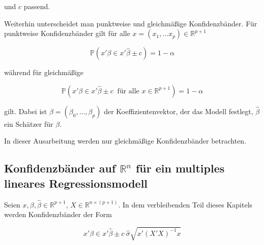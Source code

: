 \documentclass[12pt,a4paper]{article}
\theoremstyle{definition}
\newtheorem{Beispiel}[Definition]{Beispiel}
\theoremstyle{definition}
\theoremstyle{definition}
\theoremstyle{definition}
\begin{document}
und $c$ passend.

Weiterhin unterscheidet man punktweise und gleichmäßige Konfidenzbänder. Für punktweise Konfidenzbänder gilt für alle $x=(x_{1}, \ldots x_{p}) \in \mathbb{R}^{p+1}$

\begin{equation*}
\mathbb{P}(x'\beta \in x' \hat{\beta} \pm c) = 1-\alpha
\end{equation*}

während für gleichmäßige 

\begin{equation*}
\mathbb{P}(x'\beta \in x' \hat{\beta} \pm c ~ \text{ für alle } x \in \mathbb{R}^{p+1}) = 1-\alpha
\end{equation*}

gilt. Dabei ist $\beta=(\beta_{0}, \ldots, \beta_{p})$ der Koeffizientenvektor, der das Modell festlegt, $\hat{\beta}$ ein Schätzer für $\beta$. 

In dieser Ausarbeitung werden nur gleichmäßige Konfidenzbänder betrachten.



%
%
%
%

 

\subsection{Konfidenzbänder auf $\mathbb{R}^{n}$ für ein multiples lineares Regressionsmodell}
\label{Konfidenzbaender auf R fuer ein multiples lineares Regressionsmodell}
Seien  $x,\beta, \hat{\beta}  \in \mathbb{R}^{p+1}$, $X \in \mathbb{R}^{n \times (p+1)}$. In dem verbleibenden Teil dieses Kapitels werden Konfidenzbänder der Form

\begin{equation*} \label{KB_allgemein}
x' \beta \in x'\hat{\beta} \pm c ~ \hat{\sigma}\sqrt{x'(X'X)^{-1}x}
\end{equation*}
\end{document}
